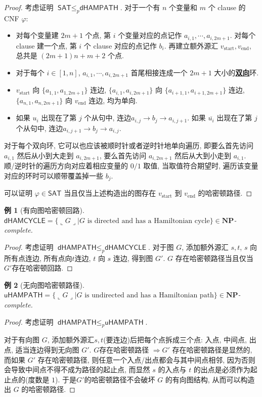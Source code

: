 \documentclass[8pt]{article}
\theoremstyle{compact}
\newtheorem{example}{例}[section]
\def\obj#1{\textbf{\uline{#1}}}
\def\le{\leqslant}
\def\rep#1{\llcorner{#1}\lrcorner}
\def\NP{\textbf{NP}}
\begin{document}
\begin{proof}
	考虑证明 $\textsf{SAT} \le_p \textsf{dHAMPATH}$. 对于一个有 $n$ 个变量和 $m$ 个 clause 的 CNF $\varphi$:
	\begin{itemize}
		\item 对每个变量建 $2m + 1$ 个点, 第 $i$ 个变量对应的点记作 $a_{i, 1}, \cdots, a_{i, 2m+1}$. 对每个 clause 建一个点, 第 $i$ 个 clause 对应的点记作 $b_i$. 再建立额外源汇 $v_{\text{start}}, v_{\text{end}}$, 总共是 $(2m+1)n + m + 2$ 个点.
		\item 对于每个 $i \in [1, n]$, $a_{i, 1}, \cdots, a_{i, 2m+1}$ 首尾相接连成一个 $2m+1$ 大小的\obj{双向}环.
		\item $v_{\text{start}}$ 向 $\{a_{1, 1}, a_{1, 2m+1}\}$ 连边, $\{a_{i, 1}, a_{i, 2m+1}\}$ 向 $\{a_{i+1, 1}, a_{i+1, 2m+1}\}$ 连边, $\{a_{n, 1}, a_{n, 2m+1}\}$ 向 $v_{\text{end}}$ 连边, 均为单向.
		\item 如果 $u_i$ 出现在了第 $j$ 个从句中, 连边$a_{i, j} \to b_j \to a_{i, j+1}$. 如果 $\overline{u_i}$ 出现在了第 $j$ 个从句中, 连边$a_{i, j+1} \to b_j \to a_{i, j}$.
	\end{itemize}

	对于每个双向环, 它可以也应该被顺时针或者逆时针地单向遍历, 即要么首先访问 $a_{i, 1}$ 然后从小到大走到 $a_{i, 2m+1}$, 要么首先访问 $a_{i, 2m+1}$ 然后从大到小走到 $a_{i, 1}$. 顺/逆时针的遍历方向对应着相应变量的 $0/1$ 取值, 当取值符合期望时, 遍历该变量对应的环时可以顺带覆盖掉一些 $b_j$.

	可以证明 $\varphi \in \textsf{SAT}$ 当且仅当上述构造出的图存在 $v_{\text{start}}$ 到 $v_{\text{end}}$ 的哈密顿路径.
\end{proof}
\begin{example}[有向图哈密顿回路]
	$\textsf{dHAMCYCLE} = \{\rep{G} | G \text{ is directed and has a Hamiltonian cycle}\} \in \NP$-complete.
\end{example}
\begin{proof}
	考虑证明 $\textsf{dHAMPATH} \le_p \textsf{dHAMCYCLE}$. 对于图 $G$, 添加额外源汇 $s, t$, $s$ 向所有点连边, 所有点向$t$连边, $t$ 向 $s$ 连边, 得到图 $G'$. $G$ 存在哈密顿路径当且仅当$G'$存在哈密顿回路.
\end{proof}
\begin{example}[无向图哈密顿路径]
	$\textsf{uHAMPATH} = \{\rep{G} | G \text{ is undirected and has a Hamiltonian path}\} \in \NP$-complete.
\end{example}
\begin{proof}
	考虑证明 $\textsf{dHAMPATH} \le_p \textsf{uHAMPATH}$. 

	对于有向图 $G$, 添加额外源汇$s, t$(要连边)后把每个点拆成三个点: 入点, 中间点, 出点, 适当连边得到无向图 $G'$. $G$存在哈密顿路径 $\Rightarrow G'$ 存在哈密顿路径是显然的, 而如果 $G'$ 存在哈密顿路径, 则任意一个入点/出点都会与其中间点相邻, 因为否则会导致中间点不得不成为路径的起止点, 而显然 $s$ 的入点与 $t$ 的出点是必须作为起止点的(度数是 $1$). 于是$G'$的哈密顿路径不会破坏 $G$ 的有向图结构, 从而可以构造出 $G$ 的哈密顿路径.	
\end{proof}
\end{document}
